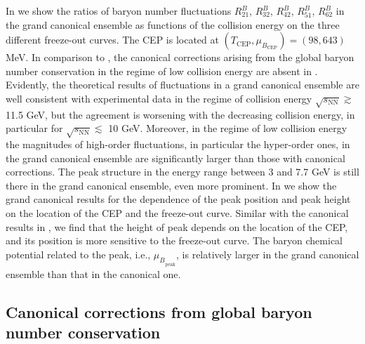 \documentclass[reprint,twocolumn,superscriptaddress,preprintnumbers,amsmath,amssymb,aps,prd,floatfix]{revtex4-2}
\begin{document}
In  we show the ratios of baryon number fluctuations $R_{21}^{B}$, $R_{32}^{B}$, $R_{42}^{B}$, $R_{51}^{B}$, $R_{62}^{B}$ in the grand canonical ensemble as functions of the collision energy on the three different freeze-out curves. The CEP is located at $(T_\mathrm{CEP},\mu_{B_{\mathrm{CEP}}})=(98,643)$\,MeV. In comparison to , the canonical corrections arising from the global baryon number conservation in the regime of low collision energy are absent in . Evidently, the theoretical results of fluctuations in a grand canonical ensemble are well consistent with experimental data in the regime of collision energy $\sqrt{s_{\mathrm{NN}}}\gtrsim$ 11.5 GeV, but the agreement is worsening with the decreasing collision energy, in particular for $\sqrt{s_{\mathrm{NN}}}\lesssim$ 10 GeV. Moreover, in the regime of low collision energy the magnitudes of high-order fluctuations, in particular the hyper-order ones, in the grand canonical ensemble are significantly larger than those with canonical corrections. The peak structure in the energy range between 3 and 7.7 GeV is still there in the grand canonical ensemble, even more prominent. In  we show the grand canonical results for the dependence of the peak position and peak height on the location of the CEP and the freeze-out curve. Similar with the canonical results in , we find that the height of peak depends on the location of the CEP, and its position is more sensitive to the freeze-out curve. The baryon chemical potential related to the peak, i.e., ${\mu_B}_{_{\mathrm{peak}}}$, is relatively larger in the grand canonical ensemble than that in the canonical one.


\subsection{Canonical corrections from global baryon number conservation}
\label{app:canonical}
\end{document}

